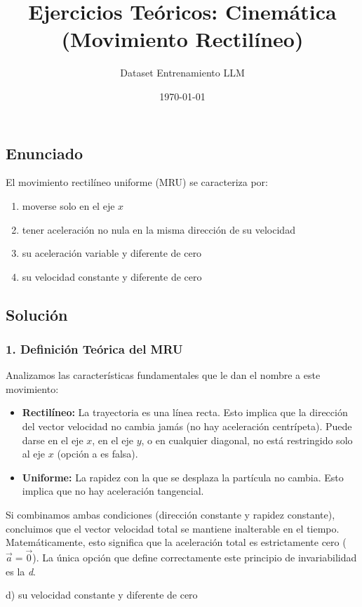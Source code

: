 \documentclass[12pt, a4paper]{article}
\title{Ejercicios Teóricos: Cinemática (Movimiento Rectilíneo)}
\author{Dataset Entrenamiento LLM}
\date{\today}
\begin{document}
\maketitle

\subsection*{Enunciado}
El movimiento rectilíneo uniforme (MRU) se caracteriza por:
\begin{enumerate}[label=\alph*)]
    \item moverse solo en el eje $x$
    \item tener aceleración no nula en la misma dirección de su velocidad
    \item su aceleración variable y diferente de cero
    \item su velocidad constante y diferente de cero
\end{enumerate}

\subsection*{Solución}

\subsubsection*{1. Definición Teórica del MRU}
Analizamos las características fundamentales que le dan el nombre a este movimiento:
\begin{itemize}
    \item \textbf{Rectilíneo:} La trayectoria es una línea recta. Esto implica que la dirección del vector velocidad no cambia jamás (no hay aceleración centrípeta). Puede darse en el eje $x$, en el eje $y$, o en cualquier diagonal, no está restringido solo al eje $x$ (opción a es falsa).
    \item \textbf{Uniforme:} La rapidez con la que se desplaza la partícula no cambia. Esto implica que no hay aceleración tangencial.
\end{itemize}
Si combinamos ambas condiciones (dirección constante y rapidez constante), concluimos que el vector velocidad total se mantiene inalterable en el tiempo. Matemáticamente, esto significa que la aceleración total es estrictamente cero ($\vec{a} = \vec{0}$). La única opción que define correctamente este principio de invariabilidad es la \textit{d}.

\begin{tcolorbox}[colback=green!5!white, colframe=green!50!black, title=Respuesta Final]
\centering \Large d) su velocidad constante y diferente de cero
\end{tcolorbox}
\end{document}
